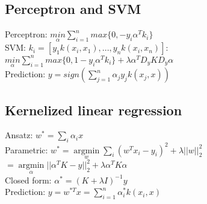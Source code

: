 \subsection*{Perceptron and SVM}
Perceptron: $\underset{\alpha}{min}\sum_{i=1}^n max\{0,-y_i \alpha^T k_i\}$\\
SVM: $k_i=[y_1 k(x_i,x_1), ..., y_n k(x_i,x_n)]$:\\
$\underset{\alpha}{min}\sum_{i=1}^n max\{0,1-y_i \alpha^T k_i\} +\lambda\alpha^T D_y K D_y \alpha$\\
Prediction: $y = sign(\sum_{j=1}^n \alpha_j y_j k(x_j,x))$

\subsection*{Kernelized linear regression}
Ansatz: $w^*=\sum_i \alpha_i x$\\
Parametric: $w^* = \underset{w}{\operatorname{argmin}} \sum_i (w^Tx_i-y_i)^2 + \lambda ||w||_2^2$\\
$= \underset{\alpha}{\operatorname{argmin}} ||\alpha^T K -y||_2^2 + \lambda \alpha^T K \alpha$\\
Closed form: $\alpha^* = (K+\lambda I)^{-1} y$\\
Prediction: $y = w^{*T} x = \sum \limits_{i=1}^n \alpha_i^* k(x_i,x)$
